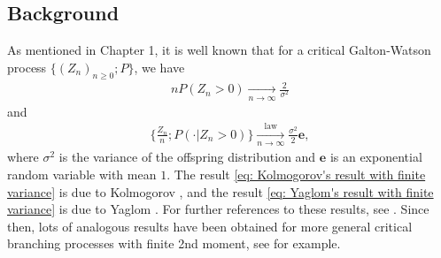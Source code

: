 \documentclass[UTF8]{pkuthss}
\theoremstyle{plain}
\theoremstyle{definition}
\numberwithin{equation}{section}
\begin{document}
\subsection{Background}
	As mentioned in Chapter 1, it is well known that for a critical Galton-Watson process $\{(Z_n)_{n\geq 0}; P\}$, we have
\begin{align}\label{eq: Kolmogorov's result with finite variance}
	n P(Z_n > 0)
	\xrightarrow[n\to \infty]{} \frac{2}{\sigma^2}
\end{align}
	and
\begin{align}\label{eq: Yaglom's result with finite variance}
	\Big\{ \frac{Z_n}{n}; P(\cdot| Z_n > 0) \Big\}
	\xrightarrow[n \to \infty]{\operatorname{law}} \frac{\sigma^2}{2} \mathbf e,
\end{align}
	where $\sigma^2$ is the variance of the offspring distribution and $\mathbf e$ is an exponential random variable with mean $1$.
	The result \eqref{eq: Kolmogorov's result with finite variance} is due to Kolmogorov \cite{Kolmogorov1938Zur-losung}, and the result \eqref{eq: Yaglom's result with finite variance} is due to Yaglom \cite{Yaglom1947Certain}.
	For further references to these results, see 
	\cite{Harris2002The-theory, KestenNeySpitzer1966The-Galton-Watson}.
	Since then, lots of analogous results have been obtained for more general
	critical branching processes with finite 2nd moment, 
	see \cite{AsmussenHering1983Branching, AthreyaNey1974Functionals, AthreyaNey1972Branching, JoffeSpitzer1967On-multitype} for example.
	
\end{document}
